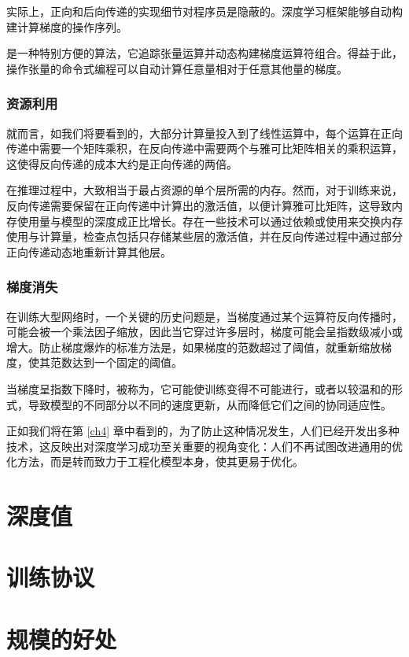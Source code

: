实际上，正向和后向传递的实现细节对程序员是隐蔽的。深度学习框架能够自动构建计算梯度的操作序列。

\citep{arxiv-1502.05767} 是一种特别方便的算法，它追踪张量运算并动态构建梯度运算符组合。得益于此，操作张量的命令式编程可以自动计算任意量相对于任意其他量的梯度。

\subsubsection*{资源利用}

就而言，如我们将要看到的，大部分计算量投入到了线性运算中，每个运算在正向传递中需要一个矩阵乘积，在反向传递中需要两个与雅可比矩阵相关的乘积运算，这使得反向传递的成本大约是正向传递的两倍。

在推理过程中，大致相当于最占资源的单个层所需的内存。然而，对于训练来说，反向传递需要保留在正向传递中计算出的激活值，以便计算雅可比矩阵，这导致内存使用量与模型的深度成正比增长。存在一些技术可以通过依赖\citep{arxiv-1707.04585}或使用来交换内存使用与计算量，检查点包括只存储某些层的激活值，并在反向传递过程中通过部分正向传递动态地重新计算其他层\citep{arxiv-1604.06174}。

\subsubsection*{梯度消失}

在训练大型网络时，一个关键的历史问题是，当梯度通过某个运算符反向传播时，可能会被一个乘法因子缩放，因此当它穿过许多层时，梯度可能会呈指数级减小或增大。防止梯度爆炸的标准方法是，如果梯度的范数超过了阈值，就重新缩放梯度，使其范数达到一个固定的阈值\citep{pascanu13}。

当梯度呈指数下降时，被称为，它可能使训练变得不可能进行，或者以较温和的形式，导致模型的不同部分以不同的速度更新，从而降低它们之间的协同适应性\citep{glorot10a}。

正如我们将在第 \ref{ch4} 章中看到的，为了防止这种情况发生，人们已经开发出多种技术，这反映出对深度学习成功至关重要的视角变化：人们不再试图改进通用的优化方法，而是转而致力于工程化模型本身，使其更易于优化。

\section{深度值}\label{sec3.6}

\section{训练协议}\label{sec3.7}

\section{规模的好处}